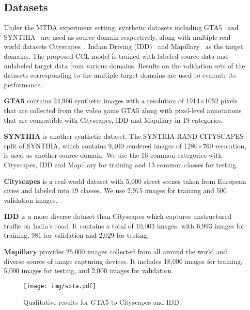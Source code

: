 \subsection{Datasets}




Under the MTDA experiment setting, synthetic datasets including GTA5~\cite{richter2016playing} and SYNTHIA~\cite{ros2016synthia} are used as source domain respectively, along with multiple real-world datasets Cityscapes~\cite{cordts2016cityscapes}, Indian Driving (IDD)~\cite{varma2019idd} and Mapillary~\cite{neuhold2017mapillary} as the target domains. The proposed CCL model is trained with labeled source data and unlabeled target data from various domains. Results on the validation sets of the datasets corresponding to the multiple target domains are used to evaluate its performance.

\textbf{GTA5} contains 24,966 synthetic images with a resolution of 1914$\times$1052 pixels that are collected from the video game GTA5 along with pixel-level annotations that are compatible with Cityscapes, IDD and Mapillary in 19 categories.

\textbf{SYNTHIA} is another synthetic dataset. The SYNTHIA-RAND-CITYSCAPES split of SYNTHIA, which contains 9,400 rendered images of 1280$\times$760 resolution, is used as another source domain. We use the 16 common categories with Cityscapes, IDD and Mapillary for training and 13 common classes for testing.

\textbf{Cityscapes} is a real-world dataset with 5,000 street scenes taken from European cities and labeled into 19 classes. We use 2,975 images for training and 500 validation images. 

\textbf{IDD} is a more diverse dataset than Cityscapes which captures unstructured traffic on India’s road. It contains a total of 10,003 images, with 6,993 images for training, 981 for validation and 2,029 for testing.

\textbf{Mapillary} provides 25,000 images collected from all around the world and diverse source of image capturing devices. It includes 18,000 images for training, 5,000 images for testing, and 2,000 images for validation. 

\begin{figure*}[t]
	\begin{center}
\texttt{[image: img/sota.pdf]}
	\end{center}
	\label{fig:target_semantic}
	\caption{Qualitative results for GTA5 to Cityscapes and IDD.}
	\vspace{-3mm}
	\label{figure:sota}
\end{figure*}















